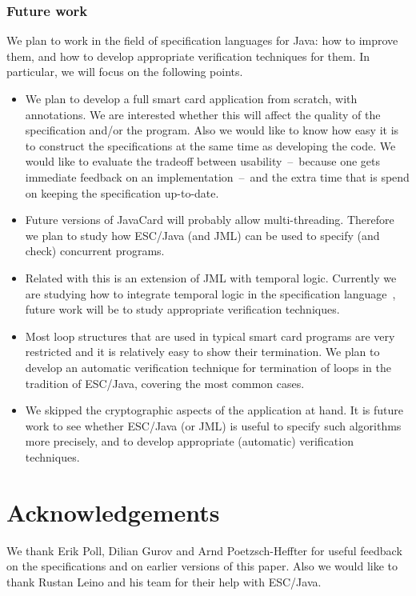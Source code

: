 \documentclass[a4paper]{llncs}
\begin{document}
\subsubsection{Future work} We plan to work in the field of
specification languages for Java: how to improve them, and how to
develop appropriate verification techniques for them. In particular,
we will focus on the following points.
\begin{itemize}
\item We plan to develop a full smart card application from scratch, with
annotations. We are interested whether this will affect the quality of 
the specification and/or the program. Also we would like to know how
easy it is to construct the specifications at the same time as
developing the code. We would like to evaluate the tradeoff between
usability~--~because one gets immediate
feedback on an implementation~--~and the extra time that
is spend on keeping the specification up-to-date.
\item Future versions of JavaCard will probably allow
multi-threading. Therefore we plan to study how ESC/Java (and JML)
can be used to specify (and check) concurrent programs.
\item Related with this is an extension of JML with
temporal logic. Currently we are studying how to integrate temporal
logic in the specification language~\cite{TrentelmanH02}, future work
will be to study appropriate verification techniques.
\item Most loop structures that are used in typical smart card
programs are very restricted and it is relatively easy to show their
termination. We plan to develop an automatic verification technique for
termination of loops in the tradition of ESC/Java, covering the most
common cases.
\item We skipped the cryptographic aspects of the application at
hand. It is future work to see whether ESC/Java (or JML) is useful to
specify such algorithms more precisely, and to develop appropriate
(automatic) verification techniques.
\end{itemize}

\section*{Acknowledgements}
We thank Erik Poll, Dilian Gurov and Arnd Poetzsch-Heffter for useful
feedback on the specifications and on earlier versions of this
paper. Also we would like to thank Rustan Leino and his team for their 
help with ESC/Java.


\end{document}
